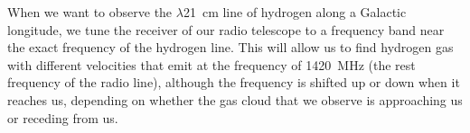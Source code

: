 When we want to observe the $\lambda$21~cm line of hydrogen along a Galactic
longitude, we tune the receiver of our radio telescope to a frequency band near
the exact frequency of the hydrogen line. This will allow us to find hydrogen
gas with different velocities that emit at the frequency of 1420~MHz (the rest
frequency of the radio line), although the frequency is shifted up or down when
it reaches us, depending on whether the gas cloud that we observe is
approaching us or receding from us. 

